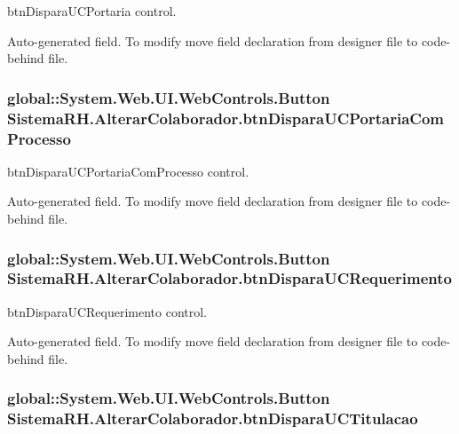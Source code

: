 btnDisparaUCPortaria control. 

Auto-\/generated field. To modify move field declaration from designer file to code-\/behind file. \hypertarget{class_sistema_r_h_1_1_alterar_colaborador_a1f1da5f84992c8b10fdb6c0495dcd159}{
\subsubsection[{btnDisparaUCPortariaComProcesso}]{\setlength{\rightskip}{0pt plus 5cm}global::System.Web.UI.WebControls.Button {\bf SistemaRH.AlterarColaborador.btnDisparaUCPortariaComProcesso}}}
\label{class_sistema_r_h_1_1_alterar_colaborador_a1f1da5f84992c8b10fdb6c0495dcd159}


btnDisparaUCPortariaComProcesso control. 

Auto-\/generated field. To modify move field declaration from designer file to code-\/behind file. \hypertarget{class_sistema_r_h_1_1_alterar_colaborador_a9710c06bd10f562da691750e622c9879}{
\subsubsection[{btnDisparaUCRequerimento}]{\setlength{\rightskip}{0pt plus 5cm}global::System.Web.UI.WebControls.Button {\bf SistemaRH.AlterarColaborador.btnDisparaUCRequerimento}}}
\label{class_sistema_r_h_1_1_alterar_colaborador_a9710c06bd10f562da691750e622c9879}


btnDisparaUCRequerimento control. 

Auto-\/generated field. To modify move field declaration from designer file to code-\/behind file. \hypertarget{class_sistema_r_h_1_1_alterar_colaborador_ab2a779632422f3526ce98d617dcc1beb}{
\subsubsection[{btnDisparaUCTitulacao}]{\setlength{\rightskip}{0pt plus 5cm}global::System.Web.UI.WebControls.Button {\bf SistemaRH.AlterarColaborador.btnDisparaUCTitulacao}}}
\label{class_sistema_r_h_1_1_alterar_colaborador_ab2a779632422f3526ce98d617dcc1beb}


